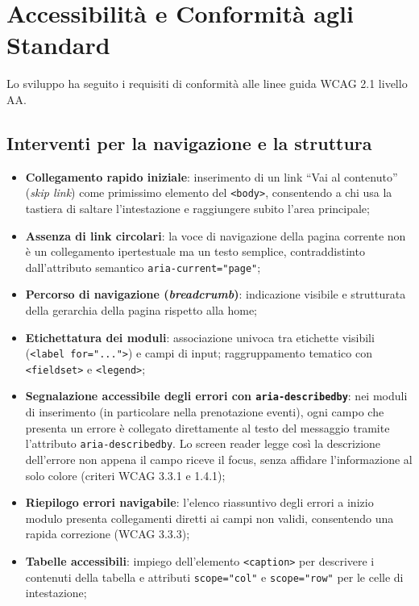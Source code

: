 \documentclass[a4paper,11pt]{article}
\begin{document}
\section{Accessibilità e Conformità agli Standard}

Lo sviluppo ha seguito i requisiti di conformità alle linee guida WCAG 2.1 livello AA.

\subsection{Interventi per la navigazione e la struttura}
\begin{itemize}
    \item \textbf{Collegamento rapido iniziale}: inserimento di un link ``Vai al contenuto'' (\textit{skip link}) come primissimo elemento del \texttt{<body>}, consentendo a chi usa la tastiera di saltare l'intestazione e raggiungere subito l'area principale;
    \item \textbf{Assenza di link circolari}: la voce di navigazione della pagina corrente non è un collegamento ipertestuale ma un testo semplice, contraddistinto dall'attributo semantico \texttt{aria-current="page"};
    \item \textbf{Percorso di navigazione (\textit{breadcrumb})}: indicazione visibile e strutturata della gerarchia della pagina rispetto alla home;
    \item \textbf{Etichettatura dei moduli}: associazione univoca tra etichette visibili (\texttt{<label for="...">}) e campi di input; raggruppamento tematico con \texttt{<fieldset>} e \texttt{<legend>};
    \item \textbf{Segnalazione accessibile degli errori con \texttt{aria-describedby}}: nei moduli di inserimento (in particolare nella prenotazione eventi), ogni campo che presenta un errore è collegato direttamente al testo del messaggio tramite l'attributo \texttt{aria-describedby}. Lo screen reader legge così la descrizione dell'errore non appena il campo riceve il focus, senza affidare l'informazione al solo colore (criteri WCAG 3.3.1 e 1.4.1);
    \item \textbf{Riepilogo errori navigabile}: l'elenco riassuntivo degli errori a inizio modulo presenta collegamenti diretti ai campi non validi, consentendo una rapida correzione (WCAG 3.3.3);
    \item \textbf{Tabelle accessibili}: impiego dell'elemento \texttt{<caption>} per descrivere i contenuti della tabella e attributi \texttt{scope="col"} e \texttt{scope="row"} per le celle di intestazione;

\end{itemize}
\end{document}
